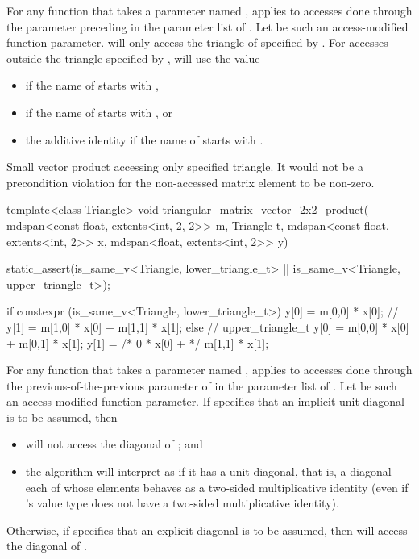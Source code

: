 \pnum
For any function  that takes
a parameter named ,
 applies to accesses done through the parameter preceding  in the parameter list of .
Let  be such an access-modified function parameter.
 will only access the triangle of  specified by .
For accesses  outside the triangle specified by ,
 will use the value
\begin{itemize}
\item
{} if the name of  starts with ,
\item
{} if the name of  starts with , or
\item
the additive identity if the name of  starts with .
\end{itemize}
\begin{example}
Small vector product accessing only specified triangle.
It would not be a precondition violation for the non-accessed
matrix element to be non-zero.
\begin{codeblock}
template<class Triangle>
void triangular_matrix_vector_2x2_product(
       mdspan<const float, extents<int, 2, 2>> m,
       Triangle t,
       mdspan<const float, extents<int, 2>> x,
       mdspan<float, extents<int, 2>> y) {

  static_assert(is_same_v<Triangle, lower_triangle_t> ||
                is_same_v<Triangle, upper_triangle_t>);

  if constexpr (is_same_v<Triangle, lower_triangle_t>) {
    y[0] = m[0,0] * x[0];       // 
    y[1] = m[1,0] * x[0] + m[1,1] * x[1];
  } else {                      // upper_triangle_t
    y[0] = m[0,0] * x[0] + m[0,1] * x[1];
    y[1] = /* 0 * x[0] + */ m[1,1] * x[1];
  }
}
\end{codeblock}
\end{example}

\pnum
For any function  that takes a parameter named ,
 applies to accesses done through
the previous-of-the-previous parameter of 
in the parameter list of .
Let  be such an access-modified function parameter.
If  specifies that an implicit unit diagonal is to be assumed, then
\begin{itemize}
\item
{} will not access the diagonal of ; and
\item
the algorithm will interpret  as if it has a unit diagonal, that is,
a diagonal each of whose elements behaves as a two-sided multiplicative identity
(even if 's value type does not have
a two-sided multiplicative identity).
\end{itemize}
Otherwise,
if  specifies that an explicit diagonal is to be assumed,
then  will access the diagonal of .

